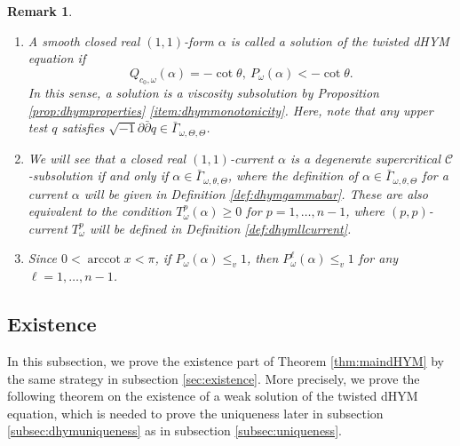 \documentclass[10pt,a4paper]{amsart}
\numberwithin{equation}{section}
\newtheorem{remark}[equation]{Remark}
\newcommand{\delb}{\sqrt{-1}\partial\bar{\partial}}
\begin{document}
\begin{remark}\label{rem:dhymvisc}
    \begin{enumerate}[label={\upshape(\roman*)}]
        \item A smooth closed real $(1,1)$-form $\alpha$ is called a solution of the twisted dHYM equation if
        \begin{equation*}
            Q_{c_0,\omega}(\alpha)=-\cot\theta,\ P_\omega(\alpha)<-\cot\theta.
        \end{equation*}
        In this sense, a solution is a viscosity subsolution by Proposition \ref{prop:dhymproperties} \ref{item:dhymmonotonicity}. Here, note that any upper test $q$ satisfies $\delb q\in\bar{\Gamma}_{\omega,\Theta,\Theta}$.
        \item We will see that a closed real $(1,1)$-current $\alpha$ is a degenerate supercritical $\mathcal{C}$-subsolution if and only if $\alpha\in\bar{\Gamma}_{\omega,\theta,\Theta}$, where the definition of $\alpha\in\bar{\Gamma}_{\omega,\theta,\Theta}$ for a current $\alpha$ will be given in Definition \ref{def:dhymgammabar}. These are also equivalent to the condition $T^p_\omega(\alpha)\ge0$ for $p=1,\dots,n-1$, where $(p,p)$-current $T^p_\omega$ will be defined in Definition \ref{def:dhymllcurrent}. 
        \item\label{item:dhymmonovisc} Since $0<\operatorname{arccot}x<\pi$, if $P_\omega(\alpha)\le_v1$, then $P^\ell_\omega(\alpha)\le_v1$ for any $\ell=1,\dots,n-1$.
    \end{enumerate}
\end{remark}

\subsection{Existence}
In this subsection, we prove the existence part of Theorem \ref{thm:maindHYM} by the same strategy in subsection \ref{sec:existence}. More precisely, we prove the following theorem on the existence of a weak solution of the twisted dHYM equation, which is needed to prove the uniqueness later in subsection \ref{subsec:dhymuniqueness} as in subsection \ref{subsec:uniqueness}.
\end{document}
